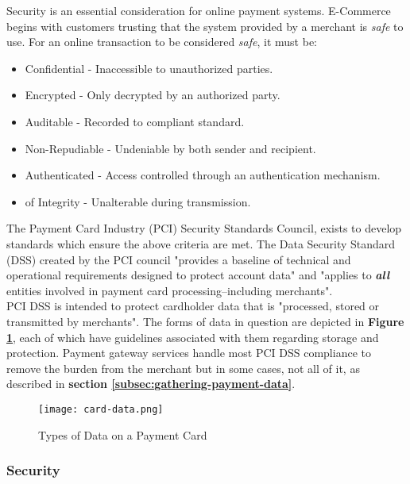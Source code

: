 Security is an essential consideration for online payment systems. E-Commerce begins with customers trusting that the system provided by a merchant is \textit{safe} to use. For an online transaction to be considered \textit{safe}, it must be:

\begin{itemize}
	\item Confidential - Inaccessible to unauthorized parties.
    \item Encrypted - Only decrypted by an authorized party.
    \item Auditable - Recorded to compliant standard.
    \item Non-Repudiable - Undeniable by both sender and recipient.
    \item Authenticated - Access controlled through an authentication mechanism.
    \item of Integrity - Unalterable during transmission.
\end{itemize}

The Payment Card Industry (PCI) Security Standards Council, exists to develop standards which ensure the above criteria are met. The Data Security Standard (DSS) created by the PCI council "provides a baseline of technical and operational requirements designed to protect account data" and "applies to \textit{\textbf{all}} entities involved in payment card processing--including merchants"\cite{PCI-DSS}.\\ 

PCI DSS is intended to protect cardholder data that is "processed, stored or transmitted by merchants"\cite{PCI-DSS}. The forms of data in question are depicted in \textbf{Figure \ref{fig:card-data}}, each of which have guidelines associated with them regarding storage and protection. Payment gateway services handle most PCI DSS compliance to remove the burden from the merchant but in some cases, not all of it, as described in \textbf{section \ref{subsec:gathering-payment-data}}.        

\begin{figure}[!hbt]
  	\centering
 	\texttt{[image: card-data.png]}
  	\caption{Types of Data on a Payment Card\cite{card-data}}
 	\label{fig:card-data}
\end{figure}

\subsubsection{Security}
\label{subsec:security}

